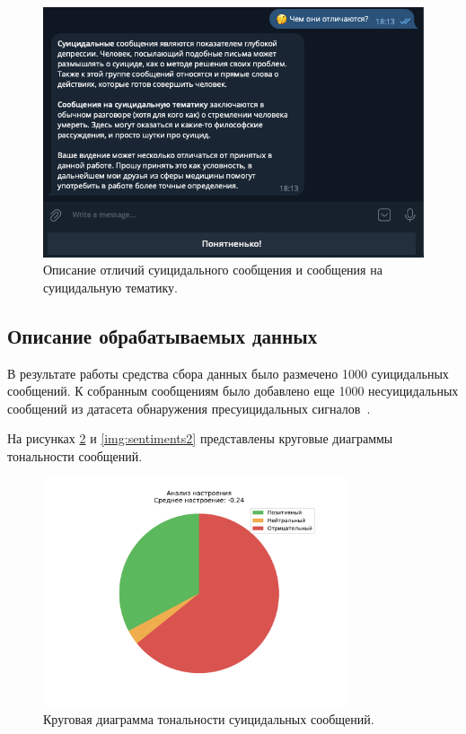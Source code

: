 \begin{figure}[H]
	\centering
	\includegraphics[width=\textwidth]{inc/teleg4.png}
	\caption{ Описание отличий суицидального сообщения и сообщения на суицидальную тематику. }
	\label{img:teleg4}
\end{figure}

\subsection{Описание обрабатываемых данных}

В результате работы средства сбора данных было размечено 1000 суицидальных сообщений. К собранным сообщениям было добавлено еще 1000 несуицидальных сообщений из датасета обнаружения пресуицидальных сигналов~\cite{dataset}. 

На рисунках \ref{img:sentiments1} и \ref{img:sentiments2} представлены круговые диаграммы тональности сообщений.

\begin{figure}[H]
	\centering
	\includegraphics[width=0.8\textwidth]{inc/plots/sentiments_suicidal.pdf}
	\caption{ Круговая диаграмма тональности суицидальных сообщений. }
	\label{img:sentiments1}
\end{figure}

